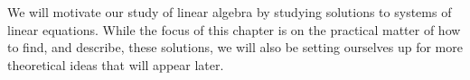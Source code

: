 We will motivate our study of linear algebra by studying solutions to systems of linear equations.  While the focus of this chapter is on the practical matter of how to find, and describe, these solutions, we will also be setting ourselves up for more theoretical ideas that will appear later.
